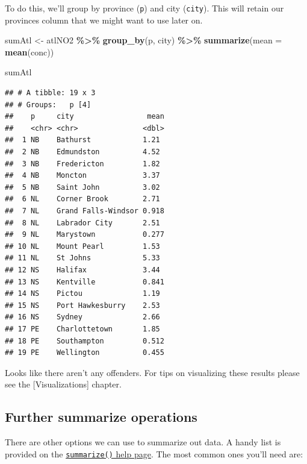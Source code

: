 \documentclass[
]{book}
\newenvironment{Shaded}{\begin{snugshade}}{\end{snugshade}}
\newcommand{\AttributeTok}[1]{\textcolor[rgb]{0.13,0.29,0.53}{#1}}
\newcommand{\FunctionTok}[1]{\textcolor[rgb]{0.13,0.29,0.53}{\textbf{#1}}}
\newcommand{\NormalTok}[1]{#1}
\newcommand{\OtherTok}[1]{\textcolor[rgb]{0.56,0.35,0.01}{#1}}
\newcommand{\SpecialCharTok}[1]{\textcolor[rgb]{0.81,0.36,0.00}{\textbf{#1}}}
\begin{document}
To do this, we'll group by province (\texttt{p}) and city (\texttt{city}). This will retain our provinces column that we might want to use later on.

\begin{Shaded}
\begin{Highlighting}[]
\NormalTok{sumAtl }\OtherTok{\textless{}{-}}\NormalTok{ atlNO2 }\SpecialCharTok{\%\textgreater{}\%}
  \FunctionTok{group\_by}\NormalTok{(p, city) }\SpecialCharTok{\%\textgreater{}\%}
  \FunctionTok{summarize}\NormalTok{(}\AttributeTok{mean =} \FunctionTok{mean}\NormalTok{(conc))}

\NormalTok{sumAtl}
\end{Highlighting}
\end{Shaded}

\begin{verbatim}
## # A tibble: 19 x 3
## # Groups:   p [4]
##    p     city                 mean
##    <chr> <chr>               <dbl>
##  1 NB    Bathurst            1.21 
##  2 NB    Edmundston          4.52 
##  3 NB    Fredericton         1.82 
##  4 NB    Moncton             3.37 
##  5 NB    Saint John          3.02 
##  6 NL    Corner Brook        2.71 
##  7 NL    Grand Falls-Windsor 0.918
##  8 NL    Labrador City       2.51 
##  9 NL    Marystown           0.277
## 10 NL    Mount Pearl         1.53 
## 11 NL    St Johns            5.33 
## 12 NS    Halifax             3.44 
## 13 NS    Kentville           0.841
## 14 NS    Pictou              1.19 
## 15 NS    Port Hawkesburry    2.53 
## 16 NS    Sydney              2.66 
## 17 PE    Charlottetown       1.85 
## 18 PE    Southampton         0.512
## 19 PE    Wellington          0.455
\end{verbatim}

Looks like there aren't any offenders. For tips on visualizing these results please see the {[}Visualizations{]} chapter.

\hypertarget{further-summarize-operations}{%
\subsection{Further summarize operations}\label{further-summarize-operations}}

There are other options we can use to summarize out data. A handy list is provided on the \href{https://dplyr.tidyverse.org/reference/summarise.html}{\texttt{summarize()} help page}. The most common ones you'll need are:
\end{document}
